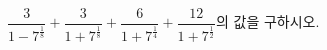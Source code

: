 $\dfrac{3}{1-7^{\frac{1}{8}}}+\dfrac{3}{1+7^{\frac{1}{8}}}+\dfrac{6}{1+7^{\frac{1}{4}}}+\dfrac{12}{1+7^{\frac{1}{2}}}$의 값을 구하시오.

